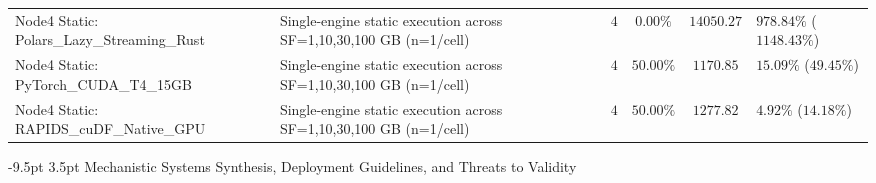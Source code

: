 \documentclass[10pt,a4paper]{article}
\makeatletter
\renewcommand\section{\@startsection{section}{1}{\z@}%
  {-9.5pt \@plus -2pt \@minus -1.5pt}%
  {3.5pt \@plus 1pt}%
  {\normalfont\large\bfseries}}
\makeatother
\begin{document}
\begin{table}[!t]
\begin{tabular}{@{}p{4.3cm}p{5.5cm}cccp{2.7cm}@{}}
Node4 Static: Polars\_Lazy\_Streaming\_Rust & Single-engine static execution across SF=1,10,30,100 GB (n=1/cell) & $4$ & $0.00\%$ & $14050.27$ & $978.84\%$ ($1148.43\%$) \\
Node4 Static: PyTorch\_CUDA\_T4\_15GB & Single-engine static execution across SF=1,10,30,100 GB (n=1/cell) & $4$ & $50.00\%$ & $1170.85$ & $15.09\%$ ($49.45\%$) \\
Node4 Static: RAPIDS\_cuDF\_Native\_GPU & Single-engine static execution across SF=1,10,30,100 GB (n=1/cell) & $4$ & $50.00\%$ & $1277.82$ & $4.92\%$ ($14.18\%$) \\
\bottomrule
\end{tabular}
\end{table}


\section{Mechanistic Systems Synthesis, Deployment Guidelines, and Threats to Validity}
\end{document}
